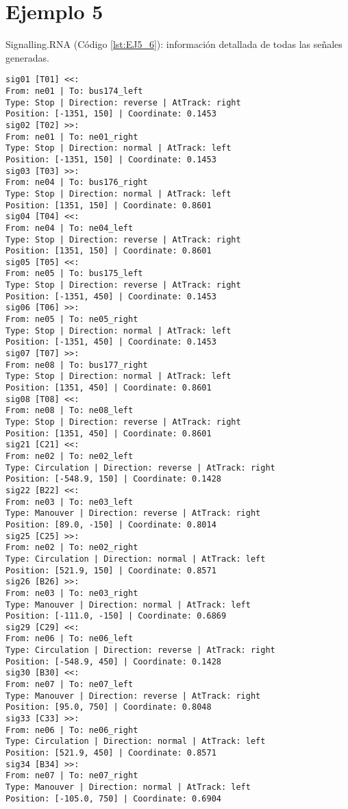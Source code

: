 	\section{Ejemplo 5}
	Signalling.RNA (Código \ref{lst:EJ5_6}): información detallada de todas las señales generadas.
	
	\begin{lstlisting}[language = {}, caption = Signalling.RNA, label = {lst:EJ5_6}]
sig01 [T01] <<:
From: ne01 | To: bus174_left
Type: Stop | Direction: reverse | AtTrack: right 
Position: [-1351, 150] | Coordinate: 0.1453
sig02 [T02] >>:
From: ne01 | To: ne01_right
Type: Stop | Direction: normal | AtTrack: left 
Position: [-1351, 150] | Coordinate: 0.1453
sig03 [T03] >>:
From: ne04 | To: bus176_right
Type: Stop | Direction: normal | AtTrack: left 
Position: [1351, 150] | Coordinate: 0.8601
sig04 [T04] <<:
From: ne04 | To: ne04_left
Type: Stop | Direction: reverse | AtTrack: right 
Position: [1351, 150] | Coordinate: 0.8601
sig05 [T05] <<:
From: ne05 | To: bus175_left
Type: Stop | Direction: reverse | AtTrack: right 
Position: [-1351, 450] | Coordinate: 0.1453
sig06 [T06] >>:
From: ne05 | To: ne05_right
Type: Stop | Direction: normal | AtTrack: left 
Position: [-1351, 450] | Coordinate: 0.1453
sig07 [T07] >>:
From: ne08 | To: bus177_right
Type: Stop | Direction: normal | AtTrack: left 
Position: [1351, 450] | Coordinate: 0.8601
sig08 [T08] <<:
From: ne08 | To: ne08_left
Type: Stop | Direction: reverse | AtTrack: right 
Position: [1351, 450] | Coordinate: 0.8601
sig21 [C21] <<:
From: ne02 | To: ne02_left
Type: Circulation | Direction: reverse | AtTrack: right 
Position: [-548.9, 150] | Coordinate: 0.1428
sig22 [B22] <<:
From: ne03 | To: ne03_left
Type: Manouver | Direction: reverse | AtTrack: right 
Position: [89.0, -150] | Coordinate: 0.8014
sig25 [C25] >>:
From: ne02 | To: ne02_right
Type: Circulation | Direction: normal | AtTrack: left 
Position: [521.9, 150] | Coordinate: 0.8571
sig26 [B26] >>:
From: ne03 | To: ne03_right
Type: Manouver | Direction: normal | AtTrack: left 
Position: [-111.0, -150] | Coordinate: 0.6869
sig29 [C29] <<:
From: ne06 | To: ne06_left
Type: Circulation | Direction: reverse | AtTrack: right 
Position: [-548.9, 450] | Coordinate: 0.1428
sig30 [B30] <<:
From: ne07 | To: ne07_left
Type: Manouver | Direction: reverse | AtTrack: right 
Position: [95.0, 750] | Coordinate: 0.8048
sig33 [C33] >>:
From: ne06 | To: ne06_right
Type: Circulation | Direction: normal | AtTrack: left 
Position: [521.9, 450] | Coordinate: 0.8571
sig34 [B34] >>:
From: ne07 | To: ne07_right
Type: Manouver | Direction: normal | AtTrack: left 
Position: [-105.0, 750] | Coordinate: 0.6904
	\end{lstlisting}	
